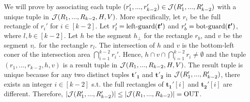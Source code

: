 
 We will prove by associating each tuple $(r_1',...,r_{k-2}')\in \mathcal{J}(R_1',...,R_{k-2}')$ with a unique tuple in $\mathcal{J}(R_1,...,R_{k-2},H,V)$. More specifically, let $r_i$ be the full rectangle of $r_i'$ for $i\in[k-2]$. Let $r'_l = \mathrm{left\text{-}guard}(\textrm{\boldmath${t'}$})$ and $r'_b = \mathrm{bot\text{-}guard}(\textrm{\boldmath${t'}$})$, where $l,b\in[k-2]$. Let $h$ be the segment $h_\bot$ for the rectangle $r_b$, and $v$ be the segment $v_\vdash$ for the rectangle $r_l$. The intersection of $h$ and $v$ is the bottom-left coner of the intersection area $\bigcap_{i = 1}^{k-2}r_i'$. Hence, $h\cap v\cap \bigcap_{i = 1}^{k-2}r_i \neq \emptyset$ and the tuple $(r_1,...,r_{k-2},h,v)$ is a result tuple in $\mathcal{J}(R_1,...,R_{k-2},H,V)$. The result tuple is unique because for any two distinct tuples $\bm{t'_1}$ and $\bm{t'_2}$ in $\mathcal{J}(R_1',...,R_{k-2}')$, there exists an integer $i \in [k-2]$ s.t. the full rectangles of $\bm{t_1'}[i]$ and $\bm{t_2'}[i]$ are different. Therefore, $|\mathcal{J}(R_1',...,R_{k-2}')| \leq |\mathcal{J}(R_1,...,R_{k-2})| = \mathrm{OUT}$.








